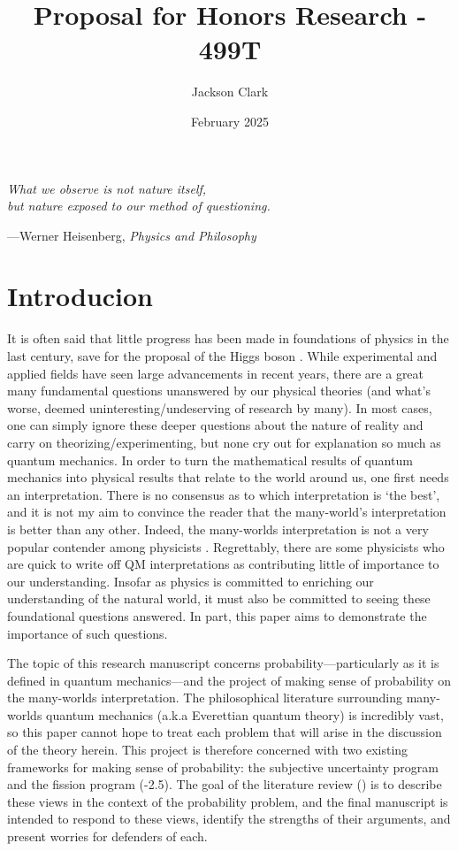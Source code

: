 \documentclass{article}
\author{Jackson Clark}
\title{Proposal for Honors Research - 499T}
\date{February 2025}
\begin{document}
\maketitle

\vfill
\epigraph{ \itshape What we observe is not nature itself,\\
but nature exposed to our method of questioning.}{---Werner Heisenberg, \textit{Physics and Philosophy}}
\vfill
\newpage
\section{Introducion}
It is often said that little progress has been made in foundations of physics in the last century, save for the proposal of the Higgs boson \parencite{higgsBrokenSymmetriesMasses1964}. While experimental and applied fields have seen large advancements in recent years, there are a great many fundamental questions unanswered by our physical theories (and what's worse, deemed uninteresting/undeserving of research by many). In most cases, one can simply ignore these deeper questions about the nature of reality and carry on theorizing/experimenting, but none cry out for explanation so much as quantum mechanics. In order to turn the mathematical results of quantum mechanics into physical results that relate to the world around us, one first needs an interpretation. There is no consensus as to which interpretation is `the best', and it is not my aim to convince the reader that the many-world's interpretation is better than any other. Indeed, the many-worlds interpretation is not a very popular contender among physicists \parencite{schlosshauerSnapshotFoundationalAttitudes2013}. 
Regrettably, there are some physicists who are quick to write off QM interpretations as contributing little of importance to our understanding.
Insofar as physics is committed to enriching our understanding of the natural world, it must also be committed to seeing these foundational questions answered.
In part, this paper aims to demonstrate the importance of such questions.

The topic of this research manuscript concerns probability—particularly as it is defined in quantum mechanics—and the project of making sense of probability on the many-worlds interpretation.
The philosophical literature surrounding many-worlds quantum mechanics (a.k.a Everettian quantum theory) is incredibly vast, so this paper cannot hope to treat each problem that will arise in the discussion of the theory herein.
This project is therefore concerned with two existing frameworks for making sense of probability: the subjective uncertainty program and the fission program (-2.5).
The goal of the literature review () is to describe these views in the context of the probability problem, and the final manuscript is intended to respond to these views, identify the strengths of their arguments, and present worries for defenders of each.
\end{document}
